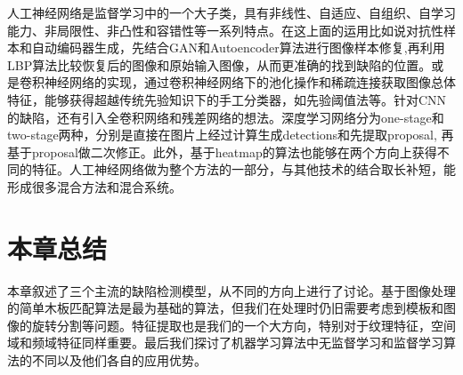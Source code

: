 人工神经网络是监督学习中的一个大子类，具有非线性、自适应、自组织、自学习能力、非局限性、非凸性和容错性等一系列特点。在这上面的运用比如说对抗性样本和自动编码器生成，先结合GAN和Autoencoder算法进行图像样本修复,再利用LBP算法比较恢复后的图像和原始输入图像，从而更准确的找到缺陷的位置。或是卷积神经网络的实现，通过卷积神经网络下的池化操作和稀疏连接获取图像总体特征，能够获得超越传统先验知识下的手工分类器，如先验阈值法等。针对CNN的缺陷，还有引入全卷积网络和残差网络的想法。深度学习网络分为one-stage和two-stage两种，分别是直接在图片上经过计算生成detections和先提取proposal, 再基于proposal做二次修正。此外，基于heatmap的算法也能够在两个方向上获得不同的特征。人工神经网络做为整个方法的一部分，与其他技术的结合取长补短，能形成很多混合方法和混合系统。

\section{本章总结}
本章叙述了三个主流的缺陷检测模型，从不同的方向上进行了讨论。基于图像处理的简单木板匹配算法是最为基础的算法，但我们在处理时仍旧需要考虑到模板和图像的旋转分割等问题。特征提取也是我们的一个大方向，特别对于纹理特征，空间域和频域特征同样重要。最后我们探讨了机器学习算法中无监督学习和监督学习算法的不同以及他们各自的应用优势。